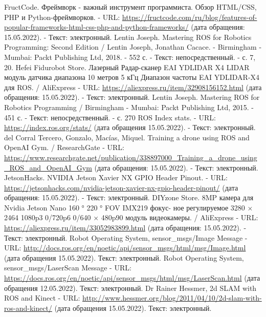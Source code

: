 \documentclass[12pt,a4paper]{scrartcl}
\newlength{\ML}
\begin{document}
	\begin{thebibliography}{9}
		 FructCode. Фреймворк - важный инструмент программиста. Обзор HTML/CSS, PHP и Python-фреймворков. - URL:
 \url{https://fructcode.com/ru/blog/features-of-popular-frameworks-html-css-php-and-python-frameworks/} (дата обращения: 15.05.2022). - Текст: электронный.
		 Lentin Joseph. Mastering ROS for Robotics Programming: Second Edition / Lentin Joseph, Jonathan Cacace. - Birmingham - Mumbai: Packt Publishing Ltd, 2018. - 552 с. - Текст: непосредственный. - с. 7, 20.
		 Hefei Fidurobot Store. Лазерный Радар-сканер EAI YDLIDAR X4 LIDAR модуль датчика диапазона 10 метров 5 кГц Диапазон частоты EAI YDLIDAR-X4 для ROS. / AliExpress - URL: \url{https://aliexpress.ru/item/32908156152.html} (дата обращения: 15.05.2022). - Текст: электронный.
		 Lentin Joseph. Mastering ROS for Robotics Programming / Birmingham - Mumbai: Packt Publishing Ltd, 2015. - 451 с. - Текст: непосредственный. - с. 270
		 ROS Index stats. - URL: \url{https://index.ros.org/stats/} (дата обращения 15.05.2022). - Текст: электронный.
		 del Corral Tercero, Gonzalo, Macías, Miquel. Training a drone using ROS and OpenAI Gym. / ResearchGate - URL: \url{https://www.researchgate.net/publication/338897000_Training_a_drone_using_ROS_and_OpenAI_Gym} (дата обращения: 15.05.2022). - Текст: электронный.
		 JetsonHacks. NVIDIA Jetson Xavier NX GPIO Header Pinout. - URL: \url{https://jetsonhacks.com/nvidia-jetson-xavier-nx-gpio-header-pinout/} (дата обращения: 15.05.2022). - Текст: электронный.
		 DIYzone Store. 8MP камера для Nvidia Jetson Nano 160 ° 220 ° FOV IMX219 фокус- ное регулируемое 3280 × 2464 1080p3 0/720p6 0/640 × 480p90 модуль видеокамеры. / AliExpress - URL: \url{https://aliexpress.ru/item/33052983899.html} (дата обращения: 15.05.2022). - Текст: электронный.
		 Robot Operating System, sensor\_msgs/Image Message - URL: \url{http://docs.ros.org/en/noetic/api/sensor\_msgs/html/msg/Image.html} (дата обращения 15.05.2022). Текст: электронный.
		 Robot Operating System, sensor\_msgs/LaserScan Message - URL: \url{https://docs.ros.org/en/noetic/api/sensor_msgs/html/msg/LaserScan.html} (дата обращения 12.05.2022). Текст: электронный.
		 Dr Rainer Hessmer, 2d SLAM with ROS and Kinect - URL: \url{http://www.hessmer.org/blog/2011/04/10/2d-slam-with-ros-and-kinect/} (дата обращения 15.05.2022). Текст: электронный.

\end{thebibliography}
\end{document}
